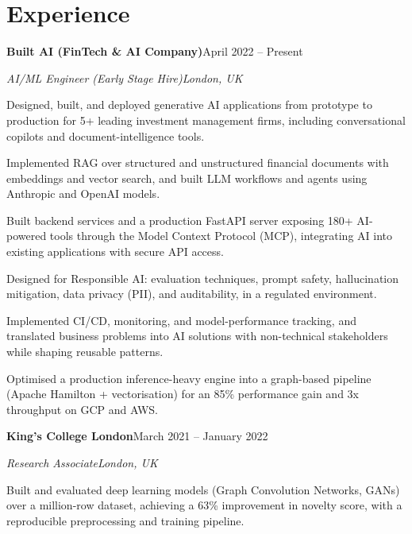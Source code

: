 \documentclass[10pt,a4paper]{article}
\newcommand{\entry}[4]{%
  {\color{company}\bfseries #1}\hfill {\color{muted}#2}\par
  \vspace{1pt}
  {\itshape #3}\hfill {\color{muted}\itshape #4}\par
  \vspace{3pt}%
}
\begin{document}
\section{Experience}
\entry{Built AI (FinTech \& AI Company)}{April 2022 -- Present}{AI/ML Engineer (Early Stage Hire)}{London, UK}
\begin{tight}
  \item Designed, built, and deployed generative AI applications from prototype to production for 5+ leading investment management firms, including conversational copilots and document-intelligence tools.
  \item Implemented RAG over structured and unstructured financial documents with embeddings and vector search, and built LLM workflows and agents using Anthropic and OpenAI models.
  \item Built backend services and a production FastAPI server exposing 180+ AI-powered tools through the Model Context Protocol (MCP), integrating AI into existing applications with secure API access.
  \item Designed for Responsible AI: evaluation techniques, prompt safety, hallucination mitigation, data privacy (PII), and auditability, in a regulated environment.
  \item Implemented CI/CD, monitoring, and model-performance tracking, and translated business problems into AI solutions with non-technical stakeholders while shaping reusable patterns.
  \item Optimised a production inference-heavy engine into a graph-based pipeline (Apache Hamilton + vectorisation) for an 85\% performance gain and 3x throughput on GCP and AWS.
\end{tight}

\entry{King's College London}{March 2021 -- January 2022}{Research Associate}{London, UK}
\begin{tight}
  \item Built and evaluated deep learning models (Graph Convolution Networks, GANs) over a million-row dataset, achieving a 63\% improvement in novelty score, with a reproducible preprocessing and training pipeline.
\end{tight}

\end{document}
